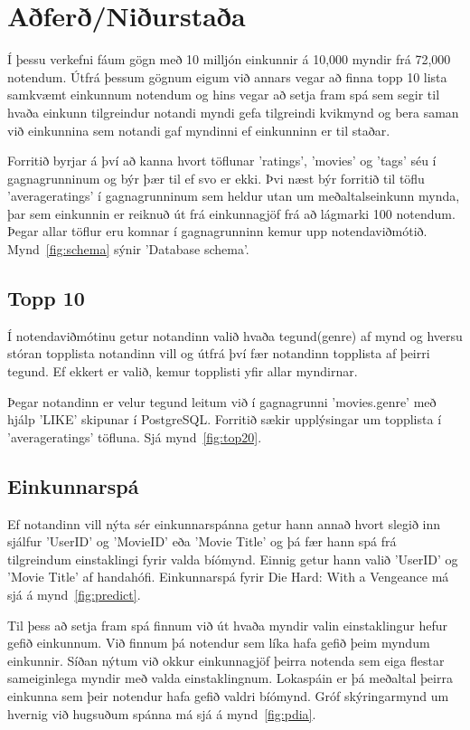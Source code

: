 \documentclass[11pt,a4paper]{amsart}
\theoremstyle{plain}
\theoremstyle{definition}
\theoremstyle{remark}
\begin{document}


\section{Aðferð/Niðurstaða}
Í þessu verkefni fáum gögn með 10 milljón einkunnir á 10,000 myndir frá 72,000 notendum.
Útfrá þessum gögnum eigum við annars vegar að finna topp 10 lista samkvæmt einkunnum notendum og hins vegar að setja fram spá sem segir til hvaða einkunn tilgreindur notandi myndi gefa tilgreindi kvikmynd og bera saman við einkunnina sem notandi gaf myndinni ef einkunninn er til staðar.  
\\\par
Forritið byrjar á því að kanna hvort töflunar 'ratings', 'movies' og 'tags' séu í gagnagrunninum og býr þær til ef svo er ekki. Þvi næst býr forritið til töflu 'averageratings' í gagnagrunninum sem heldur utan um meðaltalseinkunn mynda, þar sem einkunnin er reiknuð út frá einkunnagjöf frá að lágmarki 100 notendum. Þegar allar töflur eru komnar í gagnagrunninn kemur upp notendaviðmótið. Mynd~\ref{fig:schema} sýnir 'Database schema'.

\subsection{Topp 10}
Í notendaviðmótinu getur notandinn valið hvaða tegund(genre) af mynd og hversu stóran topplista notandinn vill og útfrá því fær notandinn topplista af þeirri tegund. Ef ekkert er valið, kemur topplisti yfir allar myndirnar.\par Þegar notandinn er velur tegund leitum við í gagnagrunni 'movies.genre' með hjálp 'LIKE' skipunar í PostgreSQL. Forritið sækir upplýsingar um topplista í 'averageratings' töfluna. Sjá mynd~\ref{fig:top20}.

\subsection{Einkunnarspá}
Ef notandinn vill nýta sér einkunnarspánna getur hann annað hvort slegið inn sjálfur 'UserID' og 'MovieID' eða 'Movie Title' og þá fær hann spá frá tilgreindum einstaklingi fyrir valda bíómynd. Einnig getur hann valið 'UserID' og 'Movie Title' af handahófi. Einkunnarspá fyrir Die Hard: With a Vengeance má sjá á mynd~\ref{fig:predict}.\par
Til þess að setja fram spá finnum við út hvaða myndir valin einstaklingur hefur gefið einkunnum. Við finnum þá notendur sem líka hafa gefið þeim myndum einkunnir. Síðan nýtum við okkur einkunnagjöf þeirra notenda sem eiga flestar sameiginlega myndir með valda einstaklingnum. Lokaspáin er þá meðaltal þeirra einkunna sem þeir notendur hafa gefið valdri bíómynd. Gróf skýringarmynd um hvernig við hugsuðum spánna má sjá á mynd~\ref{fig:pdia}.
\end{document}
